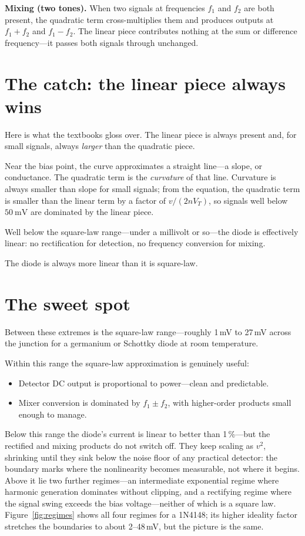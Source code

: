 \documentclass[12pt]{article}
\begin{document}
\textbf{Mixing (two tones).}
When two signals at frequencies $f_1$ and $f_2$ are both present, the quadratic term cross-multiplies them and produces outputs at $f_1 + f_2$ and $f_1 - f_2$.
The linear piece contributes nothing at the sum or difference frequency---it passes both signals through unchanged.

\section*{The catch: the linear piece always wins}

Here is what the textbooks gloss over.
The linear piece is always present and, for small signals, always \emph{larger} than the quadratic piece.

Near the bias point, the curve approximates a straight line---a slope, or conductance.
The quadratic term is the \emph{curvature} of that line.
Curvature is always smaller than slope for small signals; from the equation, the quadratic term is smaller than the linear term by a factor of $v / (2nV_T)$, so signals well below $\SI{50}{\milli\volt}$ are dominated by the linear piece.

Well below the square-law range---under a millivolt or so---the diode is effectively linear: no rectification for detection, no frequency conversion for mixing.

The diode is always more linear than it is square-law.

\section*{The sweet spot}

Between these extremes is the square-law range---roughly 1\,mV to 27\,mV across the junction for a germanium or Schottky diode at room temperature.

Within this range the square-law approximation is genuinely useful:
\begin{itemize}
  \item Detector DC output is proportional to power---clean and predictable.
  \item Mixer conversion is dominated by $f_1 \pm f_2$, with higher-order products small enough to manage.
\end{itemize}

Below this range the diode's current is linear to better than 1\,\%---but the rectified and mixing products do not switch off. They keep scaling as $v^2$, shrinking until they sink below the noise floor of any practical detector: the boundary marks where the nonlinearity becomes measurable, not where it begins.
Above it lie two further regimes---an intermediate exponential regime where harmonic generation dominates without clipping, and a rectifying regime where the signal swing exceeds the bias voltage---neither of which is a square law.
Figure~\ref{fig:regimes} shows all four regimes for a 1N4148; its higher ideality factor stretches the boundaries to about 2--48\,mV, but the picture is the same.
\end{document}
